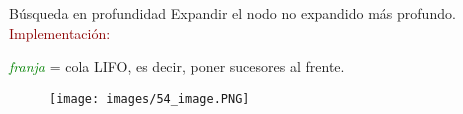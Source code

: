 \begin{frame}{Búsqueda en profundidad}
Expandir el nodo no expandido más profundo.\\
\textcolor{DarkRed}{Implementación:}
\begin{center}
    \textit{\textcolor{Green}{franja}} = cola LIFO, es decir, poner sucesores al
    frente.\\
\end{center}
\begin{figure}
    \centering
    \texttt{[image: images/54\_image.PNG]}
\end{figure}
\end{frame}{}
